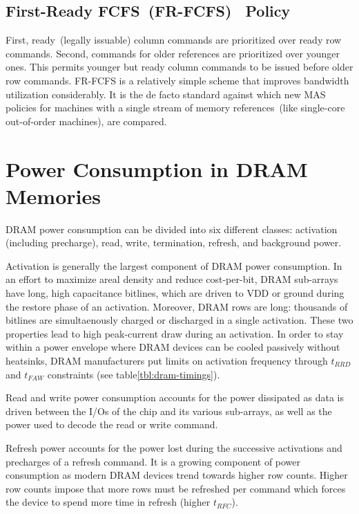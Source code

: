 \subsection{First-Ready FCFS~(FR-FCFS)~\cite{frfcfs} Policy}\label{sec:frfcfs}
First, ready~(legally issuable) column commands are prioritized over ready row
commands. Second, commands for older references are prioritized over younger
ones. This permits younger but ready column commands to be issued before older
row commands. FR-FCFS is a relatively simple scheme that improves bandwidth
utilization considerably. It is the de facto standard against which new MAS
policies for machines with a single stream of memory references~(like
single-core out-of-order machines), are compared.

\section{Power Consumption in DRAM Memories}\label{sec:dram-power}

DRAM power consumption can be divided into six different classes: activation
(including precharge), read, write, termination, refresh, and background power.

Activation is generally the largest component of DRAM power consumption.  In an
effort to maximize areal density and reduce cost-per-bit, DRAM sub-arrays have
long, high capacitance bitlines, which are driven to VDD or ground during the
restore phase of an activation. Moreover, DRAM rows are long: thousands of
bitlines are simultaenously charged or discharged in a single activation. These
two properties lead to high peak-current draw during an activation. In order to
stay within a power envelope where DRAM devices can be cooled passively without
heatsinks, DRAM manufacturers put limits on activation frequency through
$t_{RRD}$ and $t_{FAW}$ constraints (see table\ref{tbl:dram-timings}).

Read and write power consumption accounts for the power dissipated as data is
driven between the I/Os of the chip and its various sub-arrays, as well as the
power used to decode the read or write command.

Refresh power accounts for the power lost during the successive activations and
precharges of a refresh command. It is a growing component of power consumption
as modern DRAM devices trend towards higher row counts. Higher row counts impose
that more rows must be refreshed per command which forces the device to spend
more time in refresh (higher $t_{RFC}$).


